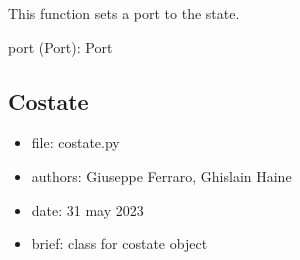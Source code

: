 \documentclass[letterpaper,10pt,english]{sphinxmanual}
\begin{document}
\begin{fulllineitems}
\begin{fulllineitems}
\end{fulllineitems}


\begin{fulllineitems}
\label{\detokenize{scrimp:scrimp.state.State.set_port}}
\pysigstartsignatures
\pysiglinewithargsret
{}
{}
{}
\pysigstopsignatures
\sphinxAtStartPar
This function sets a port to the state.
\begin{description}
\sphinxAtStartPar
port (Port): Port

\end{description}

\end{fulllineitems}


\end{fulllineitems}



\subsection{Co\sphinxhyphen{}state}
\label{\detokenize{scrimp:module-scrimp.costate}}\label{\detokenize{scrimp:co-state}}\begin{itemize}
\item {} 
\sphinxAtStartPar
file:             costate.py

\item {} 
\sphinxAtStartPar
authors:          Giuseppe Ferraro, Ghislain Haine

\item {} 
\sphinxAtStartPar
date:             31 may 2023

\item {} 
\sphinxAtStartPar
brief:            class for co\sphinxhyphen{}state object

\end{itemize}
\end{document}
